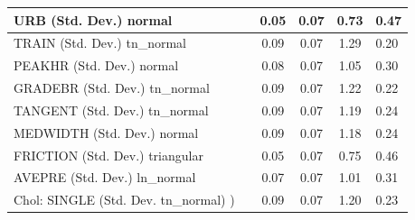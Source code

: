 \begin{table}
\begin{center}
\begin{tabular}{|l|l|c|c|c|l|}
			URB (Std. Dev.) normal &  & 0.05 & 0.07 & 0.73 & 0.47 \\
			\hline
			TRAIN (Std. Dev.) tn_normal &  & 0.09 & 0.07 & 1.29 & 0.20 \\
			\hline
			PEAKHR (Std. Dev.) normal &  & 0.08 & 0.07 & 1.05 & 0.30 \\
			\hline
			GRADEBR (Std. Dev.) tn_normal &  & 0.09 & 0.07 & 1.22 & 0.22 \\
			\hline
			TANGENT (Std. Dev.) tn_normal &  & 0.09 & 0.07 & 1.19 & 0.24 \\
			\hline
			MEDWIDTH (Std. Dev.) normal &  & 0.09 & 0.07 & 1.18 & 0.24 \\
			\hline
			FRICTION (Std. Dev.) triangular &  & 0.05 & 0.07 & 0.75 & 0.46 \\
			\hline
			AVEPRE (Std. Dev.) ln_normal &  & 0.07 & 0.07 & 1.01 & 0.31 \\
			\hline
			 Chol: SINGLE (Std. Dev. tn_normal) ) &  & 0.09 & 0.07 & 1.20 & 0.23 \\
			\hline
		\end{tabular}
	\end{center}
\end{table}